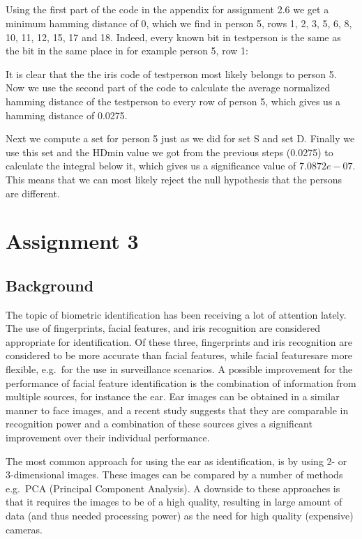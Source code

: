 \documentclass[10pt]{article}
\begin{document}
\subsection{}
Using the first part of the code in the appendix for assignment 2.6 we get a minimum hamming distance of $0$, which we find in person 5, rows 1, 2, 3, 5, 6, 8, 10, 11, 12, 15, 17 and 18. Indeed, every known bit in testperson is the same as the bit in the same place in for example person 5, row 1:

It is clear that the the iris code of testperson most likely belongs to person 5. Now we use the second part of the code to calculate the average normalized hamming distance of the testperson to every row of person 5, which gives us a hamming distance of 0.0275.

Next we compute a set for person 5 just as we did for set S and set D. Finally we use this set and the HDmin value we got from the previous steps (0.0275) to calculate the integral below it, which gives us a significance value of $7.0872e-07$. This means that we can most likely reject the null hypothesis that the persons are different.


\section{Assignment 3}
\subsection{Background}
The topic of biometric identification has been receiving a lot of attention lately. %
The use of fingerprints, facial features, and iris recognition are considered appropriate for identification.
Of these three, fingerprints and iris recognition are considered to be more accurate than facial features,
while facial featuresare more flexible, e.g.\ for the use in surveillance scenarios.
A possible improvement for the performance of facial feature identification is the combination of information from multiple sources,
for instance the ear.
Ear images can be obtained in a similar manner to face images, 
and a recent study suggests that they are comparable in recognition power\cite{chang2003comparison} 
and a combination of these sources gives a significant improvement over their individual performance.

The most common approach for using the ear as identification, is by using 2- or 3-dimensional images.
These images can be compared by a number of methods e.g.\ PCA (Principal Component Analysis).
A downside to these approaches is that it requires the images to be of a high quality,
resulting in large amount of data (and thus needed processing power) as the need for high quality (expensive)
cameras.
\end{document}
